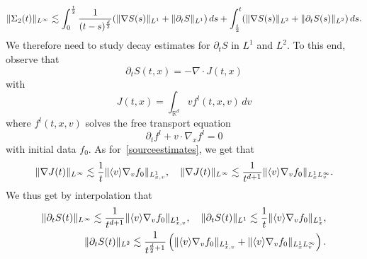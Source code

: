 \documentclass[11pt]{amsart}
\newcommand{\pa}{\partial}
\numberwithin{equation}{section}
\newcommand{\R}{\mathbb{R}}
\newcommand{\na}{\nabla}
\begin{document}
        \begin{equation*} \| \Sigma_{2}(t) \|_{L^\infty} \lesssim 
        \int_{0}^{t \over 2} { 1 \over (t-s)^{d \over 2}} ( \| \nabla S(s)\|_{L^1} + \|\partial_{t} S \|_{L^1})\, ds 
       + \int_{t \over 2}^t ( \| \nabla S(s)\|_{L^2} + \| \partial_{t} S(s)\|_{L^2} )
       \, ds .%
           \end{equation*}            
           We  therefore need to study decay estimates for $\pa_t S$ in $L^1$ and $L^2$.  To this end, observe that
    $$ \partial_{t} S(t,x) =  - \nabla \cdot J(t,x)$$ with 
    $$J(t,x) = \int_{\R^d}v  f^l(t,x,v) \, dv$$
    where $f^l(t,x,v)$ solves the free transport equation
      $$\partial_{t} f^l + v \cdot \nabla_{x} f^l = 0$$
      with initial data $f_{0}$.
 As for~\eqref{sourceestimates}, we get that
      $$    \| \na J(t)  \|_{L^\infty} \lesssim  { 1 \over t}  \|  \langle v\rangle \nabla_{v}  f_{0}\|_{L^1_{x,v}}, \quad \| \na J(t)  \|_{L^\infty} \lesssim  { 1 \over t^{d + 1 }}  \|  \langle v\rangle \nabla_{v}  f_{0}\|_{L^1_{x}L^\infty_v}. $$
               We thus get by interpolation that
      \begin{align*}
      \label{sourceestimates}  \| \partial_{t} S(t)\|_{L^\infty} \lesssim { 1 \over t^{d + 1 } }\|  \langle v\rangle \nabla_{v}  f_{0}\|_{L^1_{x,v}} , \quad    \| \partial_{t} S(t)\|_{L^1}
       \lesssim { 1\over t } \|  \langle v\rangle \nabla_{v}  f_{0}\|_{L^1_{x}} , \\
 \| \partial_{t}  S(t)\|_{L^2} \lesssim { 1 \over t^{ {d\over 2} + 1} } \left(  \|\langle v\rangle \nabla_{v} f_{0} \|_{L^1_{x,v}} + \|  \langle v\rangle \nabla_{v}  f_{0}\|_{L^1_{x}L^\infty_v} \right).
       \end{align*}
\end{document}
